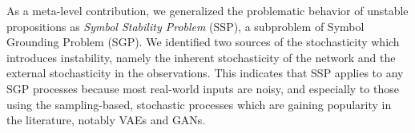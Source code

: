 As a meta-level contribution,
we generalized the problematic behavior of unstable propositions
as \emph{Symbol Stability Problem} (SSP), a subproblem of Symbol Grounding Problem (SGP).
% 
We identified two sources of the stochasticity which introduces instability,
namely
the inherent stochasticity of the network and
the external stochasticity in the observations.
% 
This indicates that
SSP applies to any SGP processes because most real-world inputs are noisy,
and especially to those using the sampling-based, stochastic processes
which are gaining popularity in the literature, notably VAEs and GANs.

